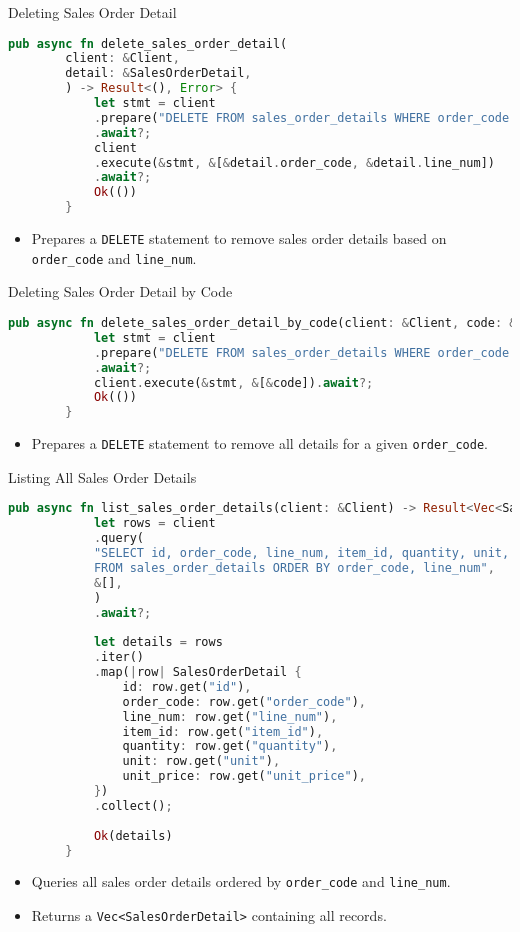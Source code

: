 \documentclass[aspectratio=169, table]{beamer}
\begin{document}
\begin{frame}[fragile]{Deleting Sales Order Detail}
	\begin{lstlisting}[language=Rust]
		pub async fn delete_sales_order_detail(
		client: &Client,
		detail: &SalesOrderDetail,
		) -> Result<(), Error> {
			let stmt = client
			.prepare("DELETE FROM sales_order_details WHERE order_code = $1 and line_num = $2")
			.await?;
			client
			.execute(&stmt, &[&detail.order_code, &detail.line_num])
			.await?;
			Ok(())
		}
	\end{lstlisting}
	\begin{itemize}
		\item Prepares a \texttt{DELETE} statement to remove sales order details based on \texttt{order\_code} and \texttt{line\_num}.
	\end{itemize}
\end{frame}

\begin{frame}[fragile]{Deleting Sales Order Detail by Code}
	\begin{lstlisting}[language=Rust]
		pub async fn delete_sales_order_detail_by_code(client: &Client, code: &str) -> Result<(), Error> {
			let stmt = client
			.prepare("DELETE FROM sales_order_details WHERE order_code = $1")
			.await?;
			client.execute(&stmt, &[&code]).await?;
			Ok(())
		}
	\end{lstlisting}
	\begin{itemize}
		\item Prepares a \texttt{DELETE} statement to remove all details for a given \texttt{order\_code}.
	\end{itemize}
\end{frame}

\begin{frame}[fragile]{Listing All Sales Order Details}
	\begin{lstlisting}[language=Rust]
		pub async fn list_sales_order_details(client: &Client) -> Result<Vec<SalesOrderDetail>, Error> {
			let rows = client
			.query(
			"SELECT id, order_code, line_num, item_id, quantity, unit, unit_price
			FROM sales_order_details ORDER BY order_code, line_num",
			&[],
			)
			.await?;
			
			let details = rows
			.iter()
			.map(|row| SalesOrderDetail {
				id: row.get("id"),
				order_code: row.get("order_code"),
				line_num: row.get("line_num"),
				item_id: row.get("item_id"),
				quantity: row.get("quantity"),
				unit: row.get("unit"),
				unit_price: row.get("unit_price"),
			})
			.collect();
			
			Ok(details)
		}
	\end{lstlisting}
	\begin{itemize}
		\item Queries all sales order details ordered by \texttt{order\_code} and \texttt{line\_num}.
		\item Returns a \texttt{Vec<SalesOrderDetail>} containing all records.
	\end{itemize}
\end{frame}
\end{document}
